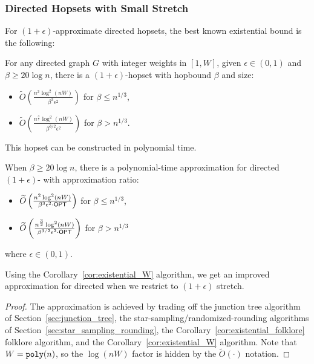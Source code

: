 \bigBeDirGen*

\subsubsection{Directed Hopsets with Small Stretch}

For $(1+\epsilon)$-approximate directed hopsets, the best known existential bound is the following:

\begin{lemma}
    For any directed graph $G$ with integer weights in $[1,W]$, given $\epsilon \in (0,1)$ and $\beta \geq  20\log n$, there is a $(1+\epsilon)$-hopset with hopbound $\beta$ and size:
    \begin{itemize}
        \item $\widetilde{O}\left(\frac{n^2\log^2(nW)}{\beta^3 \epsilon^2  }\right)$ for $\beta \leq n^{1/3}$,
        \item $\widetilde{O}\left(\frac{n^{\frac{3}{2}} \log^2(nW)}{\beta^{3/2} \epsilon^2}\right)$ for $\beta >n^{1/3}$.
    \end{itemize} 
    This hopset can be constructed in polynomial time.
\end{lemma}
\begin{corollary} \label{cor:existential_W}
    When $\beta \geq 20\log n$, there is a polynomial-time approximation for directed $(1+\epsilon)$-{\hopset} with approximation ratio:
        \begin{itemize}
        \item $\widetilde{O}\left(\frac{n^2\log^2(nW)}{\beta^3 \epsilon^2 \cdot {\sf OPT}  }\right)$ for $\beta \leq n^{1/3}$,
        \item $\widetilde{O}\left(\frac{n^{\frac{3}{2}} \log^2(nW)}{\beta^{3/2} \epsilon^2 \cdot {\sf OPT}}\right)$ for $\beta >n^{1/3}$
    \end{itemize}
    where $\epsilon \in (0,1)$.
\end{corollary}

Using the Corollary~\ref{cor:existential_W} algorithm, we get an improved approximation for directed {\hopset} when we restrict to $(1+\epsilon)$ stretch. 

\dirEps*
\begin{proof}
    The approximation is achieved by trading off the junction tree algorithm of Section~\ref{sec:junction_tree}, the star-sampling/randomized-rounding algorithms of Section~\ref{sec:star_sampling_rounding}, the Corollary~\ref{cor:existential_folklore} folklore algorithm, and the Corollary~\ref{cor:existential_W} algorithm. Note that $W = \texttt{poly}(n)$, so the $\log(nW)$ factor is hidden by the $\widetilde{O}(\cdot)$ notation.
\end{proof}



